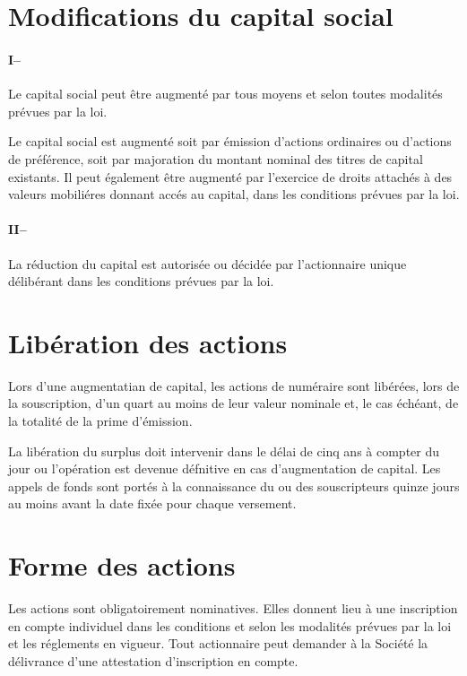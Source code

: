 \documentclass[a4paper,12pt]{report}
\begin{document}
\section{Modifications du capital social}
\paragraph{I\hspace{4mm}--}Le capital social peut être augmenté par tous moyens et selon toutes modalités prévues par la loi.

Le capital social est augmenté soit par émission d'actions ordinaires ou d'actions de préférence, soit par majoration du montant nominal des titres de capital existants. 
Il peut également être augmenté par l'exercice de droits attachés à des valeurs mobiliéres donnant accés au capital, dans les conditions prévues par la loi.

\paragraph{II\hspace{4mm}--}La réduction du capital est autorisée ou décidée par l'actionnaire unique délibérant dans les conditions prévues par la loi.

\section{Libération des actions}
Lors d'une augmentatian de capital, les actions de numéraire sont libérées, lors de la souscription, 
d'un quart au moins de leur valeur nominale et, le cas échéant, de la totalité de la prime d'émission.

La libération du surplus doit intervenir dans le délai de cinq ans à compter du jour ou l'opération est devenue défnitive en cas d'augmentation de capital. 
Les appels de fonds sont portés à la connaissance du ou des souscripteurs quinze jours au moins avant la date fixée pour chaque versement.


\section{Forme des actions}
Les actions sont obligatoirement nominatives. 
Elles donnent lieu à une inscription en compte individuel dans les conditions et selon les modalités prévues par la loi et les réglements en vigueur. 
Tout actionnaire peut demander à la Société la délivrance d'une attestation d'inscription en compte.
\end{document}

